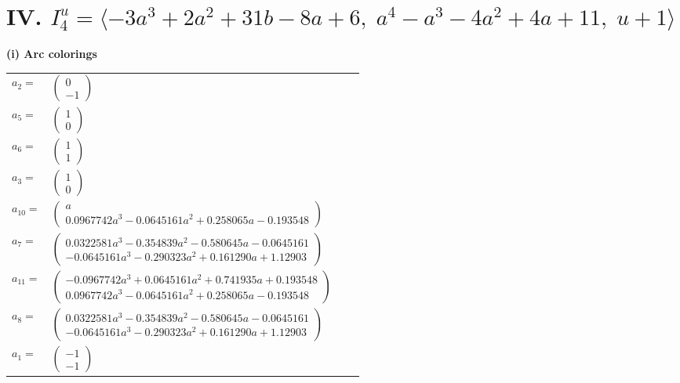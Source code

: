 \documentclass[1p]{elsarticle_modified}
\theoremstyle{definition}
\begin{document}
\centering \section*{IV. $I^u_{4}= \langle -3 a^3+2 a^2+31 b-8 a+6,\;a^4- a^3-4 a^2+4 a+11,\;u+1 \rangle$}
\flushleft \textbf{(i) Arc colorings}\\
\begin{tabular}{m{7pt} m{180pt} m{7pt} m{180pt} }
\flushright $a_{2}=$&$\begin{pmatrix}0\\-1\end{pmatrix}$ \\
\flushright $a_{5}=$&$\begin{pmatrix}1\\0\end{pmatrix}$ \\
\flushright $a_{6}=$&$\begin{pmatrix}1\\1\end{pmatrix}$ \\
\flushright $a_{3}=$&$\begin{pmatrix}1\\0\end{pmatrix}$ \\
\flushright $a_{10}=$&$\begin{pmatrix}a\\0.0967742 a^{3}-0.0645161 a^{2}+0.258065 a-0.193548\end{pmatrix}$ \\
\flushright $a_{7}=$&$\begin{pmatrix}0.0322581 a^{3}-0.354839 a^{2}-0.580645 a-0.0645161\\-0.0645161 a^{3}-0.290323 a^{2}+0.161290 a+1.12903\end{pmatrix}$ \\
\flushright $a_{11}=$&$\begin{pmatrix}-0.0967742 a^{3}+0.0645161 a^{2}+0.741935 a+0.193548\\0.0967742 a^{3}-0.0645161 a^{2}+0.258065 a-0.193548\end{pmatrix}$ \\
\flushright $a_{8}=$&$\begin{pmatrix}0.0322581 a^{3}-0.354839 a^{2}-0.580645 a-0.0645161\\-0.0645161 a^{3}-0.290323 a^{2}+0.161290 a+1.12903\end{pmatrix}$ \\
\flushright $a_{1}=$&$\begin{pmatrix}-1\\-1\end{pmatrix}$ \\

\end{tabular}
\end{document}
